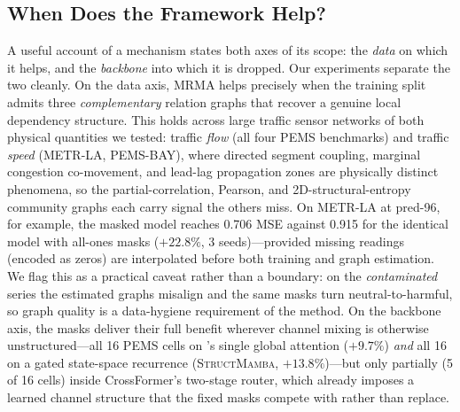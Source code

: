 
\subsection{When Does the Framework Help?}
\label{sec:scope}

A useful account of a mechanism states both axes of its scope: the \emph{data} on
which it helps, and the \emph{backbone} into which it is dropped. Our experiments
separate the two cleanly.
On the data axis, MRMA helps precisely when the training split admits three
\emph{complementary} relation graphs that recover a genuine local dependency
structure. This holds across large traffic sensor networks of both physical
quantities we tested: traffic \emph{flow} (all four PEMS benchmarks) and traffic
\emph{speed} (METR-LA, PEMS-BAY), where directed segment coupling, marginal
congestion co-movement, and lead-lag propagation zones are physically distinct
phenomena, so the partial-correlation, Pearson, and 2D-structural-entropy
community graphs each carry signal the others miss. On METR-LA at pred-96, for
example, the masked model reaches 0.706 MSE against 0.915 for the identical model
with all-ones masks ($+22.8\%$, 3 seeds)---provided missing readings (encoded as
zeros) are interpolated before both training and graph estimation. We flag this
as a practical caveat rather than a boundary: on the \emph{contaminated} series
the estimated graphs misalign and the same masks turn neutral-to-harmful, so
graph quality is a data-hygiene requirement of the method.
On the backbone axis, the masks deliver their full benefit wherever channel
mixing is otherwise unstructured---all 16 PEMS cells on \itrans{}'s single global
attention ($+9.7\%$) \emph{and} all 16 on a gated state-space recurrence
(\textsc{StructMamba}, $+13.8\%$)---but only partially (5 of 16 cells) inside
CrossFormer's two-stage router, which already imposes a learned channel
structure that the fixed masks compete with rather than replace.

